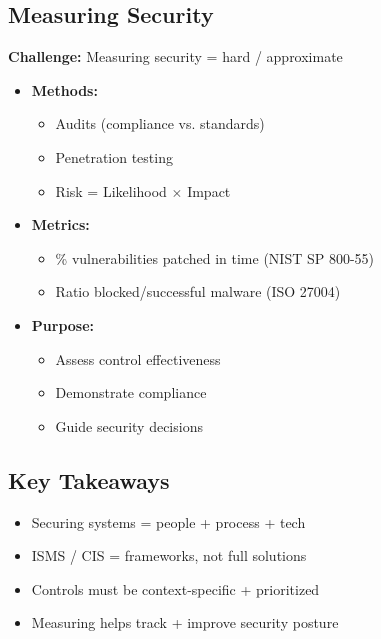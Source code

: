 \subsection{Measuring Security}
{
\textbf{Challenge:} Measuring security = hard / approximate
\begin{itemize}[noitemsep]
  \item \textbf{Methods:}
    \begin{itemize}[noitemsep]
      \item Audits (compliance vs. standards)
      \item Penetration testing
      \item Risk = Likelihood $\times$ Impact
    \end{itemize}
  \item \textbf{Metrics:}
    \begin{itemize}[noitemsep]
      \item \% vulnerabilities patched in time (NIST SP 800-55)
      \item Ratio blocked/successful malware (ISO 27004)
    \end{itemize}
  \item \textbf{Purpose:}
    \begin{itemize}[noitemsep]
      \item Assess control effectiveness
      \item Demonstrate compliance
      \item Guide security decisions
    \end{itemize}
\end{itemize}
}
\subsection{Key Takeaways}
{
\begin{itemize}[noitemsep]
  \item Securing systems = people + process + tech
  \item ISMS / CIS = frameworks, not full solutions
  \item Controls must be context-specific + prioritized
  \item Measuring helps track + improve security posture
\end{itemize}
}


